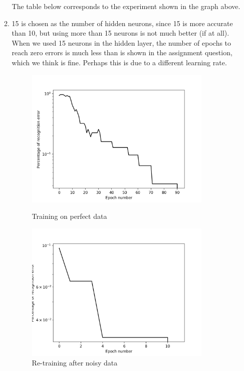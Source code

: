 \documentclass[11pt]{article}
\begin{document}
\begin{enumerate}
\begin{enumerate}
The table below corresponds to the experiment shown in the graph above.\newline


\item 15 is chosen as the number of hidden neurons, since 15 is more accurate than 10, but using more than 15 neurons is not much better (if at all). When we used 15 neurons in the hidden layer, the number of epochs to reach zero errors is much less than is shown in the assignment question, which we think is fine. Perhaps this is due to a different learning rate.\\
\begin{figure}[h!]
    \centering
    \begin{minipage}{0.45\textwidth}
    	\centering
        \includegraphics[width=0.9\textwidth]{q2-b-1} %
        \caption{Training on perfect data}
    \end{minipage}\hfill
    \begin{minipage}{0.45\textwidth}
    	\centering
         \includegraphics[width=0.9\textwidth]{q2-b-2} %
         \caption{Re-training after noisy data}
    \end{minipage}\hfill
\end{figure}


\end{enumerate}
\end{enumerate}
\end{document}
